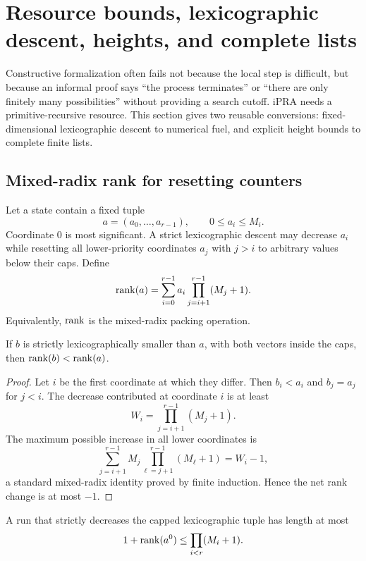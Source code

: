 \section{Resource bounds, lexicographic descent, heights, and complete lists}
\label{sec:resources}

Constructive formalization often fails not because the local step is difficult, but because an informal
proof says ``the process terminates'' or ``there are only finitely many possibilities'' without providing a
search cutoff.  iPRA needs a primitive-recursive resource.  This section gives two reusable conversions:
fixed-dimensional lexicographic descent to numerical fuel, and explicit height bounds to complete finite
lists.

\subsection{Mixed-radix rank for resetting counters}

Let a state contain a fixed tuple
\[
 a=(a_0,\ldots,a_{r-1}),
 \qquad 0\le a_i\le M_i.
\]
Coordinate \(0\) is most significant.  A strict lexicographic descent may decrease \(a_i\) while resetting
all lower-priority coordinates \(a_j\) with \(j>i\) to arbitrary values below their caps.  Define
\[
 \operatorname{rank}(a)=
 \sum_{i=0}^{r-1} a_i\prod_{j=i+1}^{r-1}(M_j+1).
\]
Equivalently, \(\operatorname{rank}\) is the mixed-radix packing operation.

\begin{lemma}
If \(b\) is strictly lexicographically smaller than \(a\), with both vectors inside the caps, then
\(\operatorname{rank}(b)<\operatorname{rank}(a)\).
\end{lemma}

\begin{proof}
Let \(i\) be the first coordinate at which they differ.  Then \(b_i<a_i\) and \(b_j=a_j\) for \(j<i\).
The decrease contributed at coordinate \(i\) is at least
\[
  W_i=\prod_{j=i+1}^{r-1}(M_j+1).
\]
The maximum possible increase in all lower coordinates is
\[
 \sum_{j=i+1}^{r-1}M_j
       \prod_{\ell=j+1}^{r-1}(M_\ell+1)
 =W_i-1,
\]
a standard mixed-radix identity proved by finite induction.  Hence the net rank change is at most \(-1\).
\end{proof}

\begin{corollary}
A run that strictly decreases the capped lexicographic tuple has length at most
\[
  1+\operatorname{rank}(a^{0})
  \le \prod_{i<r}(M_i+1).
\]
\end{corollary}

